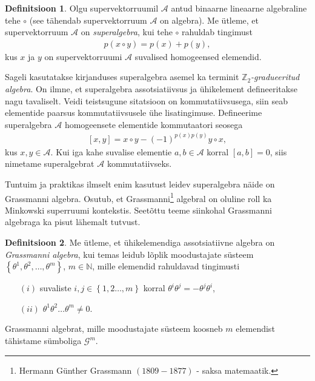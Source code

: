 \documentclass[12pt,a4paper,oneside]{article}
\theoremstyle{plain}
\theoremstyle{definition}
\newtheorem{definitsioon}{Definitsioon}[section]
\numberwithin{equation}{section}
\def\N{{\mathbb N}}
\def\Z{{\mathbb Z}}
\def\A{{\mathcal A}}
\def\G{{\mathcal G}}
\begin{document}
\begin{definitsioon}
Olgu supervektorruumil $\A$ antud binaarne lineaarne algebraline 
tehe $\circ$ (see tähendab supervektorruum $\A$ on algebra). Me 
ütleme, et supervektorruum $\A$ on \emph{superalgebra}, kui tehe 
$\circ$ rahuldab tingimust
\begin{align*}
p\left(x \circ y\right) = p\left(x\right) + p\left(y\right),
\end{align*}
kus $x$ ja $y$ on supervektorruumi $\A$ suvalised homogeensed 
elemendid.
\end{definitsioon}

Sageli kasutatakse kirjanduses superalgebra asemel ka terminit 
\emph{$\Z_2$-gradueeritud algebra}. On ilmne, et superalgebra
assotsiatiivsus ja ühikelement defineeritakse nagu tavaliselt. 
Veidi teistsugune sitatsioon on kommutatiivsusega, siin seab 
elementide paarsus kommutatiivsusele ühe lisatingimuse. Defineerime 
superalgebra $\A$ homogeensete elementide kommutaatori seosega
\begin{align*}
\left[x, y\right] = x \circ y - 
\left(-1\right)^{p\left(x\right) p\left(y\right)} y \circ x,
\end{align*}
kus $x, y \in \A$. Kui iga kahe suvalise elementie $a, b \in \A$ 
korral $\left[a, b\right] = 0$, siis nimetame superalgebrat $\A$ 
kommutatiivseks.

Tuntuim ja praktikas ilmselt enim kasutust leidev superalgebra näide 
on Grassmanni algebra. Osutub, et 
Grassmanni\footnote{Hermann Günther Grassmann $(1809 - 1877)$ - 
saksa matemaatik.} algebral on oluline roll ka Minkowski 
superruumi kontekstis. Seetõttu teeme siinkohal Grassmanni 
algebraga ka pisut lähemalt tutvust.

\begin{definitsioon} \label{def:grassmann}
Me ütleme, et ühikelemendiga assotsiatiivne algebra on 
\emph{Grassmanni algebra}, kui temas leidub lõplik moodustajate 
süsteem $\left\lbrace\theta^1, \theta^2, \ldots, 
\theta^m\right\rbrace$, $m \in \N$, mille elemendid rahuldavad 
tingimusti \begin{itemize}
\item[$(i)$] suvaliste $i, j \in \left\lbrace 1, 2 \ldots, 
m \right\rbrace$ korral $\theta^i \theta^j = - \theta^j \theta^i$,
\item[$(ii)$] $\theta^1 \theta^2 \ldots \theta^m \neq 0$.
\end{itemize}
Grassmanni algebrat, mille moodustajate süsteem koosneb $m$ 
elemendist tähistame sümboliga $\G^m$.
\end{definitsioon}
\end{document}
